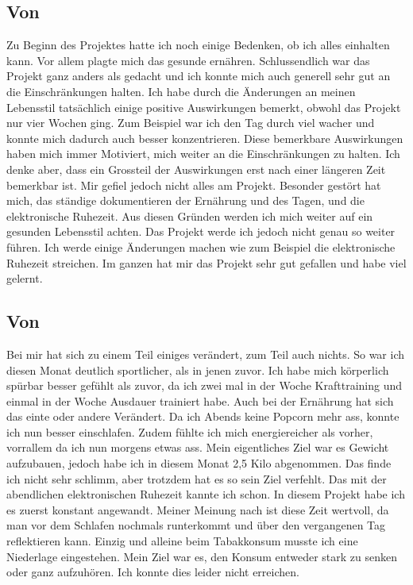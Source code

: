 \subsection{Von \dario}
\authortoc{\dario}{\subsectionident}
Zu Beginn des Projektes hatte ich noch einige Bedenken, ob ich alles einhalten kann. Vor allem plagte mich das gesunde ernähren.
\newline
Schlussendlich war das Projekt ganz anders als gedacht und ich konnte mich auch generell sehr gut an die Einschränkungen halten. Ich habe durch die Änderungen an meinen Lebensstil tatsächlich einige positive Auswirkungen bemerkt, obwohl das Projekt nur vier Wochen ging. Zum Beispiel war ich den Tag durch viel wacher und konnte mich dadurch auch besser konzentrieren. Diese bemerkbare Auswirkungen haben mich immer Motiviert, mich weiter an die Einschränkungen zu halten. Ich denke aber, dass ein Grossteil der Auswirkungen erst nach einer längeren Zeit bemerkbar ist. 
Mir gefiel jedoch nicht alles am Projekt. Besonder gestört hat mich, das ständige dokumentieren der Ernährung und des Tagen, und die elektronische Ruhezeit. Aus diesen Gründen werden ich mich weiter auf ein gesunden Lebensstil achten. Das Projekt werde ich jedoch nicht genau so weiter führen. Ich werde einige Änderungen machen wie zum Beispiel die elektronische Ruhezeit streichen. 
\newline
Im ganzen hat mir das Projekt sehr gut gefallen und habe viel gelernt.
\subsection{Von \jonas}
\authortoc{\jonas}{\subsectionident}
Bei mir hat sich zu einem Teil einiges verändert, zum Teil auch nichts. So war ich diesen Monat deutlich sportlicher, als in jenen zuvor. Ich habe mich körperlich spürbar besser gefühlt als zuvor, da ich zwei mal in der Woche Krafttraining und einmal in der Woche Ausdauer trainiert habe.
\newline
Auch bei der Ernährung hat sich das einte oder andere Verändert. Da ich Abends keine Popcorn mehr ass, konnte ich nun besser einschlafen. Zudem fühlte ich mich energiereicher als vorher, vorrallem da ich nun morgens etwas ass. Mein eigentliches Ziel war es Gewicht aufzubauen, jedoch habe ich in diesem Monat 2,5 Kilo abgenommen. Das finde ich nicht sehr schlimm, aber trotzdem hat es so sein Ziel verfehlt.
\newline
Das mit der abendlichen elektronischen Ruhezeit kannte ich schon. In diesem Projekt habe ich es zuerst konstant angewandt. Meiner Meinung nach ist diese Zeit wertvoll, da man vor dem Schlafen nochmals runterkommt und über den vergangenen Tag reflektieren kann.
\newline
\newline
Einzig und alleine beim Tabakkonsum musste ich eine Niederlage eingestehen. Mein Ziel war es, den Konsum entweder stark zu senken oder ganz aufzuhören. Ich konnte dies leider nicht erreichen.